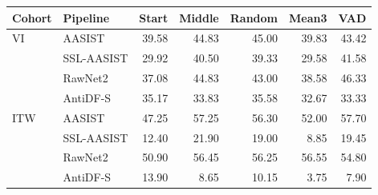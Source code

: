 \begin{tabular}{@{}llrrrrr@{}}
\toprule
Cohort & Pipeline & Start & Middle & Random & Mean3 & VAD \\
\midrule
VI & AASIST & 39.58 & 44.83 & 45.00 & 39.83 & 43.42 \\
 & SSL-AASIST & 29.92 & 40.50 & 39.33 & 29.58 & 41.58 \\
 & RawNet2 & 37.08 & 44.83 & 43.00 & 38.58 & 46.33 \\
 & AntiDF-S & 35.17 & 33.83 & 35.58 & 32.67 & 33.33 \\
ITW & AASIST & 47.25 & 57.25 & 56.30 & 52.00 & 57.70 \\
 & SSL-AASIST & 12.40 & 21.90 & 19.00 & 8.85 & 19.45 \\
 & RawNet2 & 50.90 & 56.45 & 56.25 & 56.55 & 54.80 \\
 & AntiDF-S & 13.90 & 8.65 & 10.15 & 3.75 & 7.90 \\
\bottomrule
\end{tabular}
